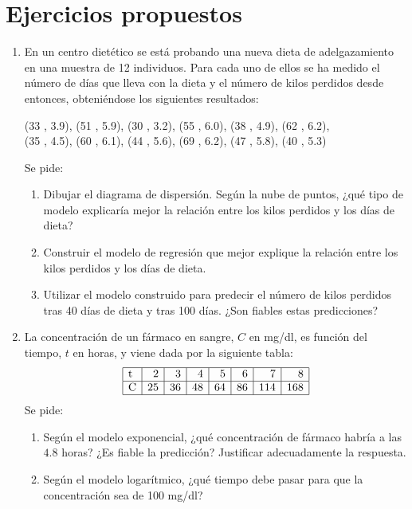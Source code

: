 \section{Ejercicios propuestos}
\begin{enumerate}[leftmargin=*]
\item En un centro dietético se está probando una nueva dieta de adelgazamiento en una
muestra de 12 individuos. Para cada uno de ellos se ha medido el número de días que
lleva con la dieta y el número de kilos perdidos desde entonces, obteniéndose los
siguientes resultados:
\begin{center}
(33 , 3.9), (51 , 5.9), (30 , 3.2), (55 , 6.0), (38 , 4.9), (62 , 6.2),\\
(35 , 4.5), (60 , 6.1), (44 , 5.6), (69 , 6.2), (47 , 5.8), (40 , 5.3)
\end{center}
Se pide:
\begin{enumerate}
  \item Dibujar el diagrama de dispersión. Según la nube de puntos, ¿qué tipo de
  modelo explicaría mejor la relación entre los kilos perdidos y los días de dieta?
  \item Construir el modelo de regresión que mejor explique la relación entre los kilos perdidos  y los días de dieta.
  \item Utilizar el modelo construido para predecir el número de kilos perdidos tras 40
  días de dieta y tras 100 días. ¿Son fiables estas predicciones?
\end{enumerate}

\item La concentración de un fármaco en sangre, $C$ en mg/dl, es función del tiempo, $t$ en horas, y viene dada por la
siguiente tabla: 
\[
\begin{array}{|l|r|r|r|r|r|r|r|}
\hline
\text{t} & 2 & 3 & 4 & 5 & 6 & 7 & 8\\
\hline
\text{C} & 25 & 36 & 48 & 64 & 86 & 114 & 168\\
\hline
\end{array}
\]
Se pide: 
\begin{enumerate}
\item Según el modelo exponencial, ¿qué concentración de fármaco habría a las $4.8$ horas? ¿Es fiable la predicción?
Justificar adecuadamente la respuesta.
\item Según el modelo logarítmico, ¿qué tiempo debe pasar para que la concentración sea de 100 mg/dl?
\end{enumerate}

\end{enumerate}